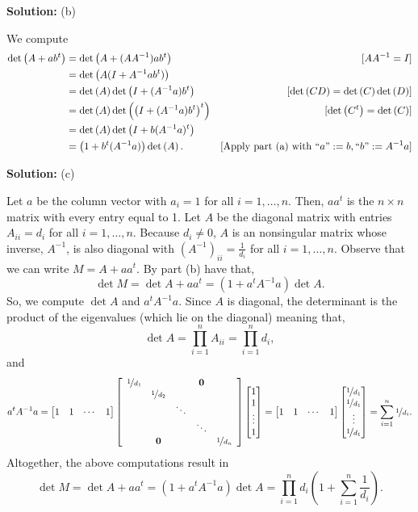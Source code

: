 \documentclass{article}
\begin{document}
\textbf{Solution:} (b)

We compute
	\begin{align*}
		\det{A + ab^t} & = \det{A + (AA^{-1}) ab^t} & [AA^{-1} = I]\\
				      & = \det{A(I+A^{-1} ab^t)}\\
				      & = \det{A}\det{I+ (A^{-1}a)b^t} & [\det{CD} = \det{C}\det{D}]\\
				      & = \det{A}\det{\left(I+ (A^{-1}a)b^t\right)^t} & [\det{C^t} = \det{C}]\\
				      & = \det{A}\det{I + b (A^{-1}a)^t}\\
				      & = \left(1 + b^t(A^{-1} a)\right)\det{A}. & [\text{Apply part (a) with } ``a":= b, ``b":=A^{-1}a]
	\end{align*}

\textbf{Solution:} (c) 

Let $a$ be the column vector with $a_i = 1$ for all $i=1,\dots, n$. Then, $aa^t$ is the $n\times n$ matrix with every entry equal to 1. Let $A$ be the diagonal matrix with entries $A_{ii} = d_i$ for all $i=1,\dots, n$. Because $d_i\neq0$, $A$ is an nonsingular matrix whose inverse, $A^{-1}$, is also diagonal with $(A^{-1})_{ii} = \frac{1}{d_i}$ for all $i=1,\dots, n$. Observe that we can write $M = A + aa^t$. By part (b) have that,
	\[\det{M} = \det{A + aa^t} = (1 + a^t A^{-1} a)\det{A}.\]
So, we compute $\det{A}$ and $a^t A^{-1} a$. Since $A$ is diagonal, the determinant is the product of the eigenvalues (which lie on the diagonal) meaning that,
	 \[\det{A} = \prod_{i=1}^n A_{ii} = \prod_{i=1}^n d_i,\]
and 
	\[a^t A^{-1} a = \begin{bmatrix} 
					1 & 1 & \cdots & 1
				\end{bmatrix}
				\begin{bmatrix}
					\begin{array}{ccccc}
 						\nicefrac{1}{d_1} &    &  & \mathbf 0   &   \\
 						  & \nicefrac{1}{d_2} &   &   &   \\
 						  &   & \ddots &   &   \\
 						  &   &   & \ddots &   \\
 						  &  \mathbf 0 &  &   & \nicefrac{1}{d_n} 
					\end{array}
				\end{bmatrix}
				\begin{bmatrix} 
					1 \\ 1 \\ \vdots \\ 1
				\end{bmatrix}
				=
				 \begin{bmatrix} 
					1 & 1 & \cdots & 1
				\end{bmatrix}
				\begin{bmatrix} 
					\nicefrac{1}{d_1} \\ \nicefrac{1}{d_1} \\ \vdots \\ \nicefrac{1}{d_1}
				\end{bmatrix}
				=
				\sum_{i=1}^n \nicefrac{1}{d_i}.
				\] 
Altogether, the above computations result in 
	\[\det{M} = \det{A + aa^t} = (1 + a^t A^{-1} a)\det{A} = \prod_{i=1}^n d_i \left( 1 + \sum_{i=1}^n \frac{1}{d_i} \right).\]
	
\end{document}
